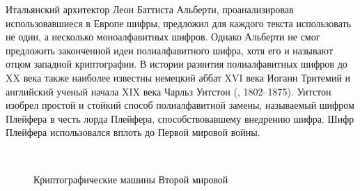 Итальянский архитектор Леон Баттиста Альберти, проанализировав использовавшиеся в Европе шифры, предложил для каждого текста использовать не один, а несколько моноалфавитных шифров. Однако Альберти не смог предложить законченной идеи полиалфавитного шифра, хотя его и называют отцом западной криптографии. В истории развития полиалфавитных шифров до XX века также наиболее известны немецкий аббат XVI века Иоганн Тритемий и английский ученый начала XIX века Чарльз Уитстон (, 1802--1875). Уитстон изобрел простой и стойкий способ полиалфавитной замены, называемый шифром Плейфера в честь лорда Плейфера, способствовавшему внедрению шифра. Шифр Плейфера использовался вплоть до Первой мировой войны.

\begin{figure}[t]
	\centering
	~~
	\caption{Криптографические машины Второй мировой}
\end{figure}

